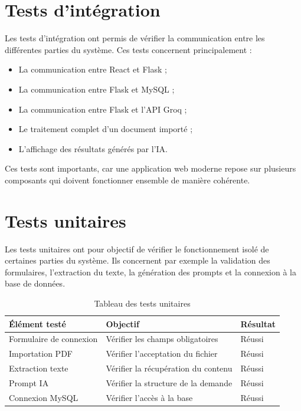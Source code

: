 \documentclass[12pt,a4paper]{report}
\begin{document}
\section{Tests d'intégration}

Les tests d'intégration ont permis de vérifier la communication entre les
différentes parties du système. Ces tests concernent principalement :

\begin{itemize}
    \item La communication entre React et Flask ;
    \item La communication entre Flask et MySQL ;
    \item La communication entre Flask et l'API Groq ;
    \item Le traitement complet d'un document importé ;
    \item L'affichage des résultats générés par l'IA.
\end{itemize}

Ces tests sont importants, car une application web moderne repose sur plusieurs
composants qui doivent fonctionner ensemble de manière cohérente.

\section{Tests unitaires}

Les tests unitaires ont pour objectif de vérifier le fonctionnement isolé de
certaines parties du système. Ils concernent par exemple la validation des
formulaires, l'extraction du texte, la génération des prompts et la connexion à
la base de données.

\begin{longtable}{|m{4cm}|m{5cm}|m{4cm}|}
\caption{Tableau des tests unitaires}\\
\hline
\textbf{Élément testé} & \textbf{Objectif} & \textbf{Résultat} \\
\hline
Formulaire de connexion & Vérifier les champs obligatoires & Réussi \\
\hline
Importation PDF & Vérifier l'acceptation du fichier & Réussi \\
\hline
Extraction texte & Vérifier la récupération du contenu & Réussi \\
\hline
Prompt IA & Vérifier la structure de la demande & Réussi \\
\hline
Connexion MySQL & Vérifier l'accès à la base & Réussi \\
\hline
\end{longtable}
\end{document}
